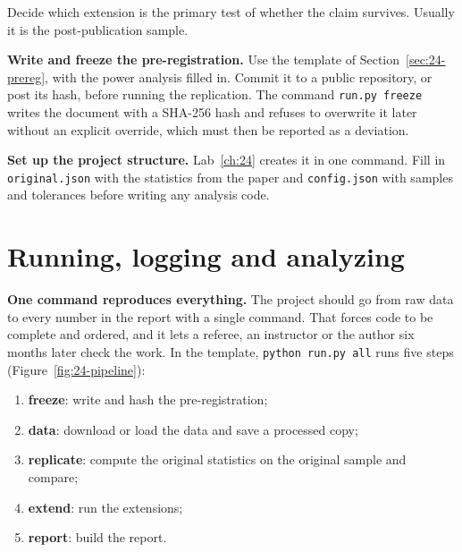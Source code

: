 Decide which extension is the primary test of whether the claim survives. Usually it is the post-publication sample.

\textbf{Write and freeze the pre-registration.} Use the template of Section~\ref{sec:24-prereg}, with the power analysis filled in. Commit it to a public repository, or post its hash, before running the replication. The command \texttt{run.py freeze} writes the document with a SHA-256 hash and refuses to overwrite it later without an explicit override, which must then be reported as a deviation.

{\sloppy \textbf{Set up the project structure.} Lab~\ref{ch:24} creates it in one command. Fill in \texttt{original.json} with the statistics from the paper and \texttt{config.json} with samples and tolerances before writing any analysis code.\par}

\section{Running, logging and analyzing}
\label{sec:24-running}

\textbf{One command reproduces everything.} The project should go from raw data to every number in the report with a single command. That forces code to be complete and ordered, and it lets a referee, an instructor or the author six months later check the work. In the template, \texttt{python run.py all} runs five steps (Figure~\ref{fig:24-pipeline}):

\begin{enumerate}
  \item \textbf{freeze}: write and hash the pre-registration;
  \item \textbf{data}: download or load the data and save a processed copy;
  \item \textbf{replicate}: compute the original statistics on the original sample and compare;
  \item \textbf{extend}: run the extensions;
  \item \textbf{report}: build the report.
\end{enumerate}

